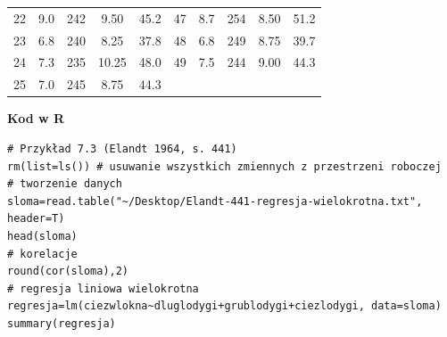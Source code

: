 \documentclass[12pt,B5paper,]{book}
\begin{document}
\begin{table}[H]
\begin{tabular}{ccccc|ccccc}
22                   & 9.0                                                      & 242                                                       & 9.50                                                      & 45.2                                                     & 47                   & 8.7                                                      & 254                                                       & 8.50                                                      & 51.2                                                     \\
23                   & 6.8                                                      & 240                                                       & 8.25                                                      & 37.8                                                     & 48                   & 6.8                                                      & 249                                                       & 8.75                                                      & 39.7                                                     \\
24                   & 7.3                                                      & 235                                                       & 10.25                                                     & 48.0                                                     & 49                   & 7.5                                                      & 244                                                       & 9.00                                                      & 44.3                                                     \\
25                   & 7.0                                                      & 245                                                       & 8.75                                                      & 44.3                                                     &                      &                                                          &                                                           &                                                           &   \\ \hline                                                      
\end{tabular}
\end{table}

\vspace{0.8cm} \textbf{Kod w R}

\begin{verbatim}
# Przykład 7.3 (Elandt 1964, s. 441)
rm(list=ls()) # usuwanie wszystkich zmiennych z przestrzeni roboczej
# tworzenie danych
sloma=read.table("~/Desktop/Elandt-441-regresja-wielokrotna.txt", header=T)
head(sloma)
# korelacje
round(cor(sloma),2)
# regresja liniowa wielokrotna
regresja=lm(ciezwlokna~dluglodygi+grublodygi+ciezlodygi, data=sloma)
summary(regresja)
\end{verbatim}
\end{document}
